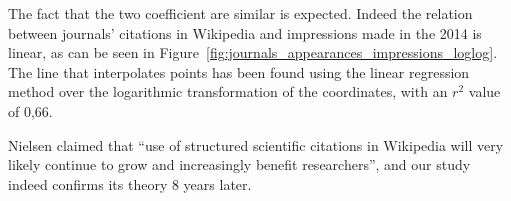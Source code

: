 The fact that the two coefficient are similar is expected.
Indeed the relation between journals' citations in Wikipedia and impressions made in the 2014 is linear, as can be seen in Figure~\ref{fig:journals_appearances_impressions_loglog}.
The line that interpolates points has been found using the linear regression method over the logarithmic transformation of the coordinates, with an $r^2$ value of 0,66.

Nielsen claimed that ``use of structured scientific citations in Wikipedia will very likely continue to grow and increasingly benefit researchers'', and our study indeed confirms its theory 8 years later.
